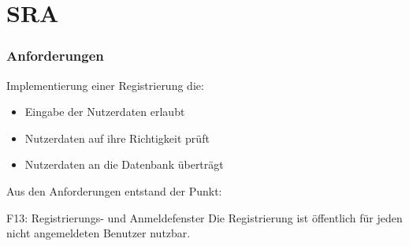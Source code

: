 \section{SRA}
\begin{frame} %
  \frametitle{Anforderungen} %

Implementierung einer Registrierung die:

\bigskip

  \begin{itemize}
   \item Eingabe der Nutzerdaten erlaubt
   \item Nutzerdaten auf ihre Richtigkeit prüft
   \item Nutzerdaten an die Datenbank überträgt
  \end{itemize}

    Aus den Anforderungen entstand der Punkt:

  \bigskip

  \begin{block}{F13: Registrierungs- und Anmeldefenster}
	Die Registrierung ist öffentlich für jeden nicht angemeldeten Benutzer nutzbar.
  \end{block}

\end{frame}
